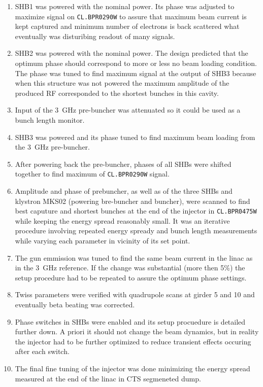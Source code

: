 \begin{enumerate}
\item
SHB1 was powered with the nominal power. 
Its phase was adjusted to maximize signal on \texttt{CL.BPR0290W} to 
assure that maximum beam current is kept captured and minimum number of electrons
is back scattered what eventually was disturibing readout of many signals.
\item
SHB2 was powered with the nominal power. 
The design predicted that the optimum phase should correspond to more or less no beam loading condition.
The phase was tuned to find maximum signal at the output of SHB3
because when this structure was not powered the maximum amplitude of the produced RF 
corresponded to the shortest bunches in this cavity. 
\item
Input of the 3~GHz pre-buncher was attenuated so it could be used as a bunch length monitor.
\item
SHB3 was powered and its phase tuned to find maximum beam loading from the 3~GHz pre-buncher.
\item
After powering back the pre-buncher, phases of all SHBs were shifted together to find maximum
of \texttt{CL.BPR0290W} signal.
\item
Amplitude and phase of prebuncher, as well as of the three SHBs and klystron MKS02 (powering bre-buncher and buncher),
were scanned to find best caputure and shortest bunches at the end of the injector in \texttt{CL.BPR0475W}
while keeping the energy spread reasonably small.
It was an iterative procedure involving repeated energy spready and bunch length measurements
while varying each parameter in vicinity of its set point.
\item
The gun emmission was tuned to find the same beam current in the linac as in the 3~GHz reference.
If the change was substantial (more then 5\%) the setup procedure had to be repeated to assure the optimum phase settings. 
\item
Twiss parameters were verified with quadrupole scans at girder 5 and 10 
and eventually beta beating was corrected.
\item
Phase switches in SHBs were enabled and its setup procuedure is detailed further down. 
A priori it should not change the beam dynamics,
but in reality the injector had to be further optimized to reduce transient effects occuring after each switch.
\item
The final fine tuning of the injector was done minimizing the energy spread measured 
at the end of the linac in CTS segmeneted dump.
\end{enumerate}


